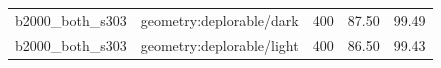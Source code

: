 \begin{longtable}{l>{\raggedright\arraybackslash}p{.42\linewidth}rrr}
b2000\_\allowbreak{}both\_\allowbreak{}s303 & %
geometry:deplorable/dark & %
400 & %
87.50 & %
99.49 \\ %

b2000\_\allowbreak{}both\_\allowbreak{}s303 & %
geometry:deplorable/light & %
400 & %
86.50 & %
99.43 \\ %


\end{longtable}
